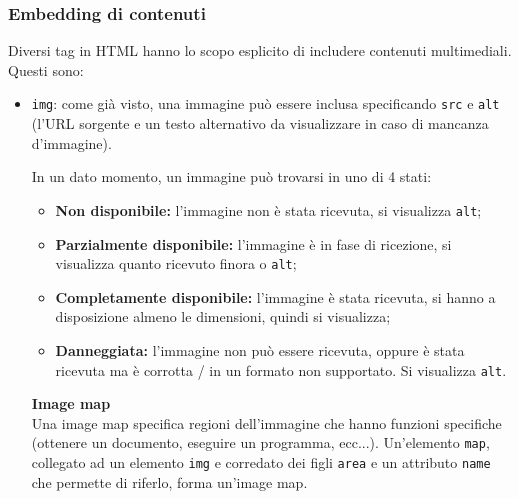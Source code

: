 \documentclass[a4paper,11pt]{article}
\begin{document}
\subsubsection{Embedding di contenuti}
Diversi tag in HTML hanno lo scopo esplicito di includere contenuti multimediali.
Questi sono:
\begin{itemize}
	\item \lstinline|img|: come già visto, una immagine può essere inclusa specificando \lstinline|src| e \lstinline|alt| (l'URL sorgente e un testo alternativo da visualizzare in caso di mancanza d'immagine).

		In un dato momento, un immagine può trovarsi in uno di 4 stati:
		\begin{itemize}
			\item \textbf{Non disponibile:} l'immagine non è stata ricevuta, si visualizza \lstinline|alt|;
			\item \textbf{Parzialmente disponibile:} l'immagine è in fase di ricezione, si visualizza quanto ricevuto finora o \lstinline|alt|;
			\item \textbf{Completamente disponibile:} l'immagine è stata ricevuta, si hanno a disposizione almeno le dimensioni, quindi si visualizza;
			\item \textbf{Danneggiata:} l'immagine non può essere ricevuta, oppure è stata ricevuta ma è corrotta / in un formato non supportato. Si visualizza \lstinline|alt|.
		\end{itemize}

		\textbf{\textsf{Image map}} \\ 
		Una image map specifica regioni dell'immagine che hanno funzioni specifiche (ottenere un documento, eseguire un programma, ecc...).
		Un'elemento \lstinline|map|, collegato ad un elemento \lstinline|img| e corredato dei figli \lstinline|area| e un attributo \lstinline|name| che permette di riferlo, forma un'image map.


\end{itemize}
\end{document}
